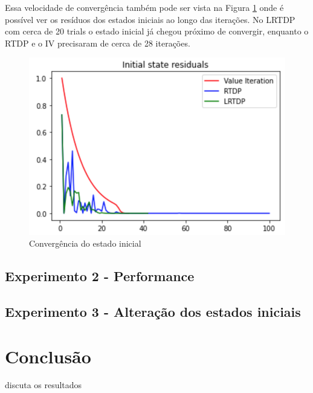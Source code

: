 \documentclass[letterpaper]{article}
\begin{document}
Essa velocidade de convergência também pode ser vista na Figura \ref{fig:initial-state-convergency} onde é possível ver os resíduos dos estados iniciais ao longo das iterações. No LRTDP com cerca de 20 trials o estado inicial já chegou próximo de convergir, enquanto o RTDP e o IV precisaram de cerca de 28 iterações.

\begin{figure}[t]
    \centering
    \includegraphics[width=0.9\columnwidth]{initial-state-convergency}
    \caption{Convergência do estado inicial}
    \label{fig:initial-state-convergency}
\end{figure}


\subsection{Experimento 2 - Performance}


\subsection{Experimento 3 - Alteração dos estados iniciais}


\section{Conclusão}
discuta os resultados



\end{document}
